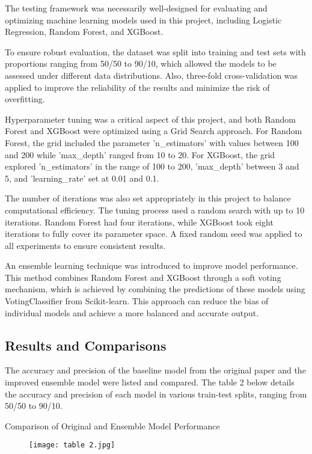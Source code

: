 \documentclass[conference]{IEEEtran}
\begin{document}
The testing framework was necessarily well-designed for evaluating and optimizing machine learning models used in this project, including Logistic Regression, Random Forest, and XGBoost.

To ensure robust evaluation, the dataset was split into training and test sets with proportions ranging from 50/50 to 90/10, which allowed the models to be assessed under different data distributions. Also, three-fold cross-validation was applied to improve the reliability of the results and minimize the risk of overfitting.

Hyperparameter tuning was a critical aspect of this project, and both Random Forest and XGBoost were optimized using a Grid Search approach. For Random Forest, the grid included the parameter 'n\_estimators' with values between 100 and 200 while 'max\_depth' ranged from 10 to 20. For XGBoost, the grid explored 'n\_estimators' in the range of 100 to 200, 'max\_depth' between 3 and 5, and 'learning\_rate' set at 0.01 and 0.1. 

The number of iterations was also set appropriately in this project to balance computational efficiency. The tuning process used a random search with up to 10 iterations. Random Forest had four iterations, while XGBoost took eight iterations to fully cover its parameter space. A fixed random seed was applied to all experiments to ensure consistent results.

An ensemble learning technique was introduced to improve model performance. This method combines Random Forest and XGBoost through a soft voting mechanism, which is achieved by combining the predictions of these models using VotingClassifier from Scikit-learn. This approach can reduce the bias of individual models and achieve a more balanced and accurate output.

\subsection{Results and Comparisons}

The accuracy and precision of the baseline model from the original paper and the improved ensemble model were listed and compared. The table 2 below details the accuracy and precision of each model in various train-test splits, ranging from 50/50 to 90/10.

\begin{table}[htbp]
\caption{Comparison of Original and Ensemble Model Performance}
\end{table}
\vspace{-2.5em} 
\begin{figure}[h]
    \centering
    \texttt{[image: table 2.jpg]}
\end{figure}
\end{document}
